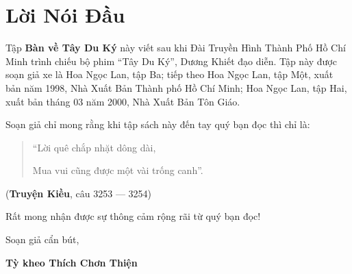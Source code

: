 \chapter*{Lời Nói Đầu} %
\label{cha:loi_noi_dau}

Tập {\bf Bàn về Tây Du Ký} này viết sau khi Đài Truyền Hình Thành Phố Hồ Chí Minh trình chiếu bộ phim ``Tây Du Ký'', Dương Khiết đạo diễn. Tập này được soạn giả xe là Hoa Ngọc Lan, tập Ba; tiếp theo Hoa Ngọc Lan, tập Một, xuất bản năm 1998, Nhà Xuất Bản Thành phố Hồ Chí Minh; Hoa Ngọc Lan, tập Hai, xuất bản tháng 03 năm 2000, Nhà Xuất Bản Tôn Giáo.

Soạn giả chỉ mong rằng khi tập sách này đến tay quý bạn đọc thì chỉ là:

\begin{verse}
\begin{itshape}
``Lời quê chắp nhặt dông dài,

Mua vui cũng được một vài trống canh''.
\end{itshape}
\end{verse}

\hfill
({\bf Truyện Kiều}, câu 3253 --- 3254)

Rất mong nhận được sự thông cảm rộng rãi từ quý bạn đọc!

\vfill
\hfill
\begin{minipage}{0.6\textwidth}
\begin{center}
Soạn giả cẩn bút,

{\bf Tỳ kheo Thích Chơn Thiện}
\end{center}
\end{minipage}
\vfill
